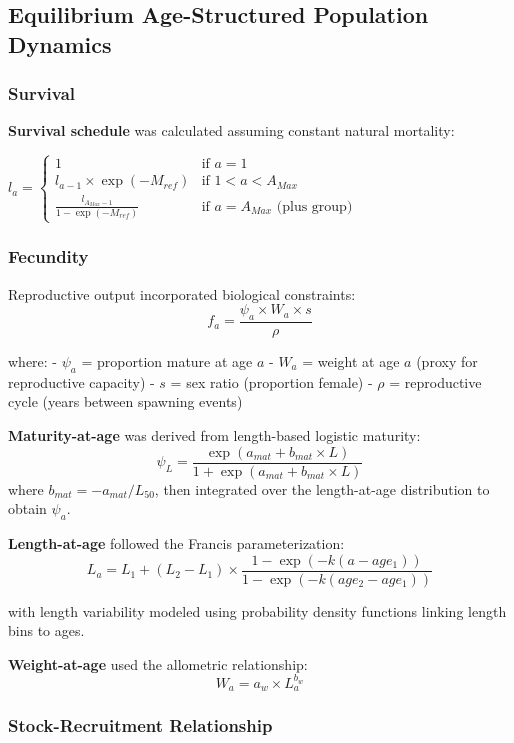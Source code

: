 \documentclass[
  11pt,
]{SCreport}
\begin{document}
\subsection{Equilibrium Age-Structured Population
Dynamics}\label{sec-equilibrium-dynamics}

\subsubsection{Survival}\label{sec-survival}

\textbf{Survival schedule} was calculated assuming constant natural
mortality:

\(l_a = \begin{cases}
1 & \text{if } a = 1 \\
l_{a-1} \times \exp(-M_{ref}) & \text{if } 1 < a < A_{Max} \\
\frac{l_{A_{Max}-1}}{1-\exp(-M_{ref})} & \text{if } a = A_{Max} \text{ (plus group)}
\end{cases}\)

\subsubsection{Fecundity}\label{sec-fecundity-calculation}

Reproductive output incorporated biological constraints:
\[f_a = \frac{\psi_a \times W_a \times s}{\rho}\]

where: - \(\psi_a\) = proportion mature at age \(a\) - \(W_a\) = weight
at age \(a\) (proxy for reproductive capacity) - \(s\) = sex ratio
(proportion female) - \(\rho\) = reproductive cycle (years between
spawning events)

\textbf{Maturity-at-age} was derived from length-based logistic
maturity:
\[\psi_L = \frac{\exp(a_{mat} + b_{mat} \times L)}{1 + \exp(a_{mat} + b_{mat} \times L)}\]
where \(b_{mat} = -a_{mat}/L_{50}\), then integrated over the
length-at-age distribution to obtain \(\psi_a\).

\textbf{Length-at-age} followed the Francis parameterization:
\[L_a = L_1 + (L_2 - L_1) \times \frac{1 - \exp(-k(a - age_1))}{1 - \exp(-k(age_2 - age_1))}\]

with length variability modeled using probability density functions
linking length bins to ages.

\textbf{Weight-at-age} used the allometric relationship:
\[W_a = a_w \times L_a^{b_w}\]

\subsubsection{Stock-Recruitment
Relationship}\label{sec-stock-recruitment}
\end{document}
